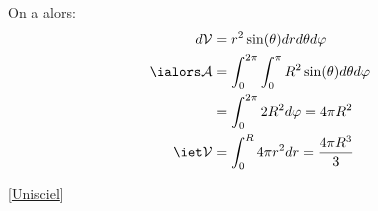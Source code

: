 {\begin{center}
    \end{center}
    On a alors:
    \begin{align*}
        d\V &= r^2 \sin(\theta) dr d\theta d\varphi\\
        \ialors \A &= \int_{0}^{2\pi} \int_{0}^{\pi} R^2 \sin(\theta) d\theta d\varphi\\
        &= \int_{0}^{2\pi} 2R^2 d\varphi
        = 4\pi R^2\\
        \iet \V &= \int_{0}^{R} 4\pi r^2 dr
        = \frac{4\pi R^3}{3}
    \end{align*}
}[\href{https://uel.unisciel.fr/chimie/strucmic/strucmic_ch03/co/apprendre_ch03_1_06.html}{Unisciel}]